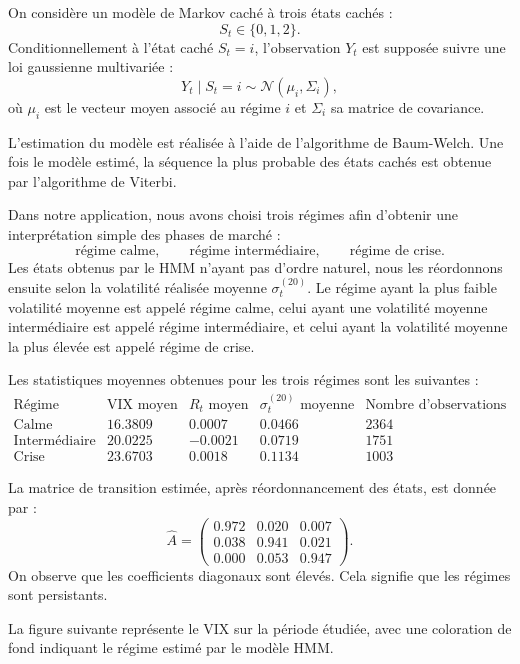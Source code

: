\documentclass[11pt]{article}
\begin{document}
On considère un modèle de Markov caché à trois états cachés :
\[
    S_t \in \{0,1,2\}.
\]
Conditionnellement à l'état caché $S_t=i$, l'observation $Y_t$ est supposée suivre une loi gaussienne multivariée :
\[
    Y_t \mid S_t=i \sim \mathcal{N}(\mu_i,\Sigma_i),
\]
où $\mu_i$ est le vecteur moyen associé au régime $i$ et $\Sigma_i$ sa matrice de covariance. 

L'estimation du modèle est réalisée à l'aide de l'algorithme de Baum-Welch. Une fois le modèle estimé, la séquence la plus probable des états cachés est obtenue par l'algorithme de Viterbi.

Dans notre application, nous avons choisi trois régimes afin d'obtenir une interprétation simple des phases de marché :
\[
    \text{régime calme}, \qquad
    \text{régime intermédiaire}, \qquad
    \text{régime de crise}.
\]
Les états obtenus par le HMM n'ayant pas d'ordre naturel, nous les réordonnons ensuite selon la volatilité réalisée moyenne $\sigma^{(20)}_t$. Le régime ayant la plus faible volatilité moyenne est appelé régime calme, celui ayant une volatilité moyenne intermédiaire est appelé régime intermédiaire, et celui ayant la volatilité moyenne la plus élevée est appelé régime de crise.
\vspace{0.5cm}

Les statistiques moyennes obtenues pour les trois régimes sont les suivantes :
\[
\begin{array}{c|cccc}
\text{Régime} & \text{VIX moyen} & R_t \text{ moyen} & \sigma^{(20)}_t \text{ moyenne} & \text{Nombre d'observations} \\
\hline
\text{Calme} & 16.3809 & 0.0007 & 0.0466 & 2364 \\
\text{Intermédiaire} & 20.0225 & -0.0021 & 0.0719 & 1751 \\
\text{Crise} & 23.6703 & 0.0018 & 0.1134 & 1003
\end{array}
\]

\vspace{0.5cm}
La matrice de transition estimée, après réordonnancement des états, est donnée par :
\[
    \widehat{A}
    =
    \begin{pmatrix}
        0.972 & 0.020 & 0.007 \\
        0.038 & 0.941 & 0.021 \\
        0.000 & 0.053 & 0.947
    \end{pmatrix}.
\]
On observe que les coefficients diagonaux sont élevés. Cela signifie que les régimes sont persistants.

La figure suivante représente le VIX sur la période étudiée, avec une coloration de fond indiquant le régime estimé par le modèle HMM.
\end{document}

